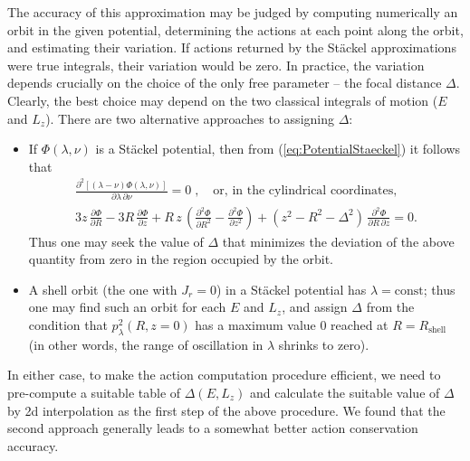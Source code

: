 \documentclass[12pt]{article}
\renewcommand{\d}{\partial}
\begin{document}
The accuracy of this approximation may be judged by computing numerically an orbit in the given potential, determining the actions at each point along the orbit, and estimating their variation. If actions returned by the St\"ackel approximations were true integrals, their variation would be zero. In practice, the variation depends crucially on the choice of the only free parameter -- the focal distance $\Delta$. Clearly, the best choice may depend on the two classical integrals of motion ($E$ and $L_z$). There are two alternative approaches to assigning $\Delta$:
\begin{itemize}
\item If $\Phi(\lambda,\nu)$ is a St\"ackel potential, then from (\ref{eq:PotentialStaeckel}) it follows that 
\begin{subequations}
\begin{align}
\frac{\d^2[(\lambda-\nu)\Phi(\lambda,\nu)]}{\d\lambda\,\d\nu} = 0\;,
\quad\mbox{or, in the cylindrical coordinates,} \\
3 z\, \frac{\d\Phi}{\d R} - 3 R\, \frac{\d\Phi}{\d z} +
R\,z\,\left(\frac{\d^2\Phi}{\d R^2} - \frac{\d^2\Phi}{\d z^2}\right) +
(z^2 - R^2 - \Delta^2)\,\frac{\d^2\Phi}{\d R\,\d z} = 0 .
\end{align}
\end{subequations}
Thus one may seek the value of $\Delta$ that minimizes the deviation of the above quantity from zero in the region occupied by the orbit.
\item A shell orbit (the one with $J_r=0$) in a St\"ackel potential has $\lambda=\mathrm{const}$; thus one may find such an orbit for each $E$ and $L_z$, %
and assign $\Delta$ from the condition that $p_\lambda^2(R,z=0)$ has a maximum value 0 reached at $R=R_\mathrm{shell}$ (in other words, the range of oscillation in $\lambda$ shrinks to zero).
\end{itemize}
In either case, to make the action computation procedure efficient, we need to pre-compute a suitable table of $\Delta(E,L_z)$ and calculate the suitable value of $\Delta$ by 2d interpolation as the first step of the above procedure.
We found that the second approach generally leads to a somewhat better action conservation accuracy.
\end{document}
